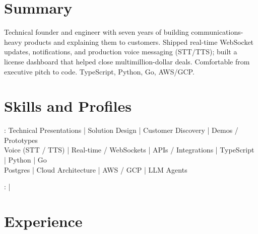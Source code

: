 \documentclass[print]{jack-resume}
\begin{document}
\pagecolor{darkmodeBackground}


\begin{minipage}[t][1cm][t]{.03\textwidth}
    \hfill
\end{minipage}

\section{Summary}
Technical founder and engineer with seven years of building communications-heavy products and explaining them to customers. Shipped real-time WebSocket updates, notifications, and production voice messaging (STT/TTS); built a license dashboard that helped close multimillion-dollar deals. Comfortable from executive pitch to code. TypeScript, Python, Go, AWS/GCP.
\sectionsep

\section{Skills and Profiles}
:
Technical Presentations \hfill | \hfill
Solution Design \hfill | \hfill
Customer Discovery \hfill | \hfill
Demos / Prototypes \\
\hspace{1.0cm} Voice (STT / TTS) \hfill | \hfill
Real-time / WebSockets \hfill | \hfill
APIs / Integrations \hfill | \hfill
TypeScript \hfill | \hfill
Python \hfill | \hfill
Go \\
\hspace{1.0cm} Postgres \hfill | \hfill
Cloud Architecture \hfill | \hfill
AWS / GCP \hfill | \hfill
LLM Agents \\

\raggedright{
    :
      \href{https://www.linkedin.com/in/jack-sturtevant/}{ \ExternalLink} |
     \href{https://github.com/jacksturt}{ \ExternalLink}}

\section{Experience}
\end{document}
